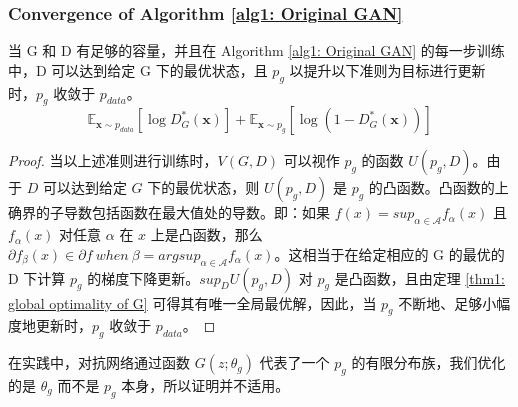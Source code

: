 \documentclass{myarticle}
\begin{document}
    \subsubsection{Convergence of Algorithm \ref{alg1: Original GAN}}

    \begin{proposition}
        当 G 和 D 有足够的容量，并且在 Algorithm \ref{alg1: Original GAN} 的每一步训练中，D 可以达到给定 G 下的最优状态，且 $p_g$ 以提升以下准则为目标进行更新时，$p_g$ 收敛于 $p_{data}$。
        \begin{equation}
            \mathbb{E}_{\bm{x}\sim p_{data}} \left [\log D_G^{*}(\bm{x})\right ] + \mathbb{E}_{\bm{x}\sim p_g} \left [\log (1-D_G^{*}(\bm{x}))\right ]
        \end{equation}
    \end{proposition}

    \begin{proof}
        当以上述准则进行训练时，$V(G,D)$ 可以视作 $p_g$ 的函数 $U(p_g,D)$。由于 $D$ 可以达到给定 $G$ 下的最优状态，则 $U(p_g,D)$ 是 $p_g$ 的凸函数。凸函数的上确界的子导数包括函数在最大值处的导数。即：如果 $f(x)=sup_{\alpha\in\mathcal{A}}f_{\alpha}(x)$ 且 $f_{\alpha}(x)$ 对任意 $\alpha$ 在 $x$ 上是凸函数，那么 $\partial f_{\beta}(x)\in\partial f\ when\ \beta=argsup_{\alpha\in\mathcal{A}}f_{\alpha}(x)$。这相当于在给定相应的 G 的最优的 D 下计算 $p_g$ 的梯度下降更新。$sup_D U(p_g,D)$ 对 $p_g$ 是凸函数，且由定理 \ref{thm1: global optimality of G} 可得其有唯一全局最优解，因此，当 $p_g$ 不断地、足够小幅度地更新时，$p_g$ 收敛于 $p_{data}$。
        
        \QED
    \end{proof}

    \rmk 在实践中，对抗网络通过函数 $G(z;\theta_g)$ 代表了一个 $p_g$ 的有限分布族，我们优化的是 $\theta_g$ 而不是 $p_g$ 本身，所以证明并不适用。

    \clearpage
    
    
\end{document}

